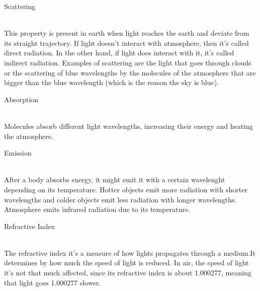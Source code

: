 \documentclass[a4paper]{article}
\begin{document}
\begin{enumerate}
{\bf \item  Scattering}
\\
This property is present in earth when light reaches the earth and deviate from  its straight trajectory. If light doesn't interact with atmosphere, then it's called direct radiation. In the other hand, if light does interact with it, it's called indirect radiation. Examples of scattering are the light that goes through clouds or the  scattering of blue wavelengths by the molecules of the atmosphere that are bigger than the blue wavelength (which is the reason the sky is blue). 
{\bf \item Absorption }
\\
Molecules absorb different light wavelengths, increasing their energy and heating the atmosphere. 
{\bf \item Emission}
\\
After a body absorbs energy, it might emit it with a certain wavelenght depending on its temperature. Hotter objects emit more radiation with shorter wavelengths and colder objects emit less radiation with longer wavelengths. Atmosphere emits infrared radiation due to its temperature. 
{\bf \item Refractive Index}
\\
The refractive index it's a measure of how lights propagates through a medium.It determines by how much the speed of light is reduced. In air, the speed of light it's not that much affected, since its refractive index is about  1.000277, meaning that light goes 1.000277 slower. 
\end{enumerate}
\end{document}
